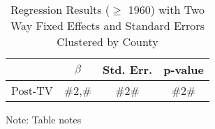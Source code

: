 \noindent 
\begin{table}[H]
\caption{Regression Results ($\geq$ 1960) with Two Way Fixed Effects and Standard Errors Clustered by County\label{tab:regression_ge_1960_cls}}
\medskip{}

\begin{centering}
\begin{tabular}{cccc}
\hline 
 & $\beta$ & Std. Err. & p-value\tabularnewline
\hline 
Post-TV & \#2,\# & \#2\# & \#2\#\tabularnewline
\hline 
\end{tabular}
\par\end{centering}
\begin{centering}
\medskip{}
\par\end{centering}
{\footnotesize{}Note: Table notes}{\footnotesize\par}
\end{table}